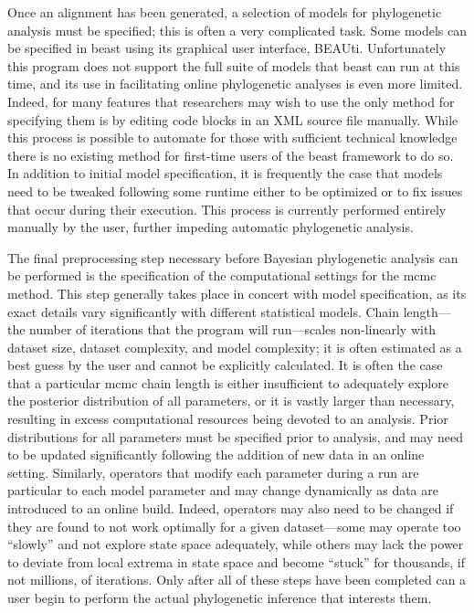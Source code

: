 Once an alignment has been generated, a selection of models for phylogenetic analysis must be specified; this is often a very complicated task.
Some models can be specified in \gls{beast} using its graphical user interface, BEAUti.
Unfortunately this program does not support the full suite of models that \gls{beast} can run at this time, and its use in facilitating online phylogenetic analyses is even more limited.
Indeed, for many features that researchers may wish to use the only method for specifying them is by editing code blocks in an XML source file manually.
While this process is possible to automate for those with sufficient technical knowledge there is no existing method for first-time users of the \gls{beast} framework to do so. %
In addition to initial model specification, it is frequently the case that models need to be tweaked following some runtime either to be optimized or to fix issues that occur during their execution.
This process is currently performed entirely manually by the user, further impeding automatic phylogenetic analysis.

The final preprocessing step necessary before Bayesian phylogenetic analysis can be performed is the specification of the computational settings for the \gls{mcmc} method.
This step generally takes place in concert with model specification, as its exact details vary significantly with different statistical models.
Chain length---the number of iterations that the program will run---scales non-linearly with dataset size, dataset complexity, and model complexity; it is often estimated as a best guess by the user and cannot be explicitly calculated.
It is often the case that a particular \gls{mcmc} chain length is either insufficient to adequately explore the posterior distribution of all parameters, or it is vastly larger than necessary, resulting in excess computational resources being devoted to an analysis.
Prior distributions for all parameters must be specified prior to analysis, and may need to be updated significantly following the addition of new data in an online setting.
Similarly, operators that modify each parameter during a run are particular to each model parameter and may change dynamically as data are introduced to an online build.
Indeed, operators may also need to be changed if they are found to not work optimally for a given dataset---some may operate too ``slowly'' and not explore state space adequately, while others may lack the power to deviate from local extrema in state space and become ``stuck'' for thousands, if not millions, of iterations.
Only after all of these steps have been completed can a user begin to perform the actual phylogenetic inference that interests them.

